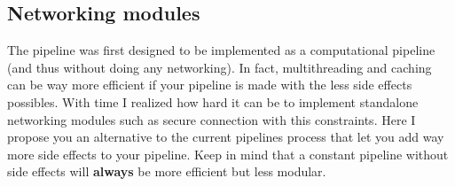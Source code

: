 \begin{DoxyCode}{0}
\DoxyCodeLine{\{}
\DoxyCodeLine{}
\DoxyCodeLine{\}}
\end{DoxyCode}


\subsection*{Networking modules}

The pipeline was first designed to be implemented as a computational pipeline (and thus without doing any networking). In fact, multithreading and caching can be way more efficient if your pipeline is made with the less side effects possibles. With time I realized how hard it can be to implement standalone networking modules such as secure connection with this constraints. Here I propose you an alternative to the current pipeline\textquotesingle{}s process that let you add way more side effects to your pipeline. Keep in mind that a constant pipeline without side effects will {\bfseries{always}} be more efficient but less modular.


